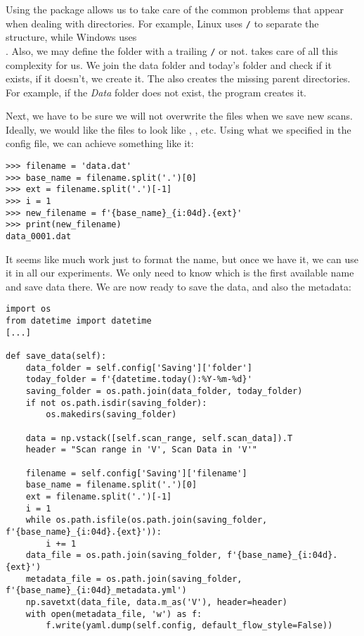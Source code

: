 Using the package  allows us to take care of the common problems that appear when dealing with directories. For example, Linux uses \texttt{/} to separate the structure, while Windows uses \texttt{\\}. Also, we may define the folder with a trailing \texttt{/} or not.  takes care of all this complexity for us. We join the data folder and today's folder and check if it exists, if it doesn't, we create it. The  also creates the missing parent directories. For example, if the \emph{Data} folder does not exist, the program creates it.

Next, we have to be sure we will not overwrite the files when we save new scans. Ideally, we would like the files to look like , , etc. Using what we specified in the config file, we can achieve something like it:

\begin{verbatim}
>>> filename = 'data.dat'
>>> base_name = filename.split('.')[0]
>>> ext = filename.split('.')[-1]
>>> i = 1
>>> new_filename = f'{base_name}_{i:04d}.{ext}'
>>> print(new_filename)
data_0001.dat
\end{verbatim}

It seems like much work just to format the name, but once we have it, we can use it in all our experiments. We only need to know which is the first available name and save data there. We are now ready to save the data, and also the metadata:

\begin{verbatim}
import os
from datetime import datetime
[...]

def save_data(self):
    data_folder = self.config['Saving']['folder']
    today_folder = f'{datetime.today():%Y-%m-%d}'
    saving_folder = os.path.join(data_folder, today_folder)
    if not os.path.isdir(saving_folder):
        os.makedirs(saving_folder)

    data = np.vstack([self.scan_range, self.scan_data]).T
    header = "Scan range in 'V', Scan Data in 'V'"

    filename = self.config['Saving']['filename']
    base_name = filename.split('.')[0]
    ext = filename.split('.')[-1]
    i = 1
    while os.path.isfile(os.path.join(saving_folder, f'{base_name}_{i:04d}.{ext}')):
        i += 1
    data_file = os.path.join(saving_folder, f'{base_name}_{i:04d}.{ext}')
    metadata_file = os.path.join(saving_folder, f'{base_name}_{i:04d}_metadata.yml')
    np.savetxt(data_file, data.m_as('V'), header=header)
    with open(metadata_file, 'w') as f:
        f.write(yaml.dump(self.config, default_flow_style=False))
\end{verbatim}

